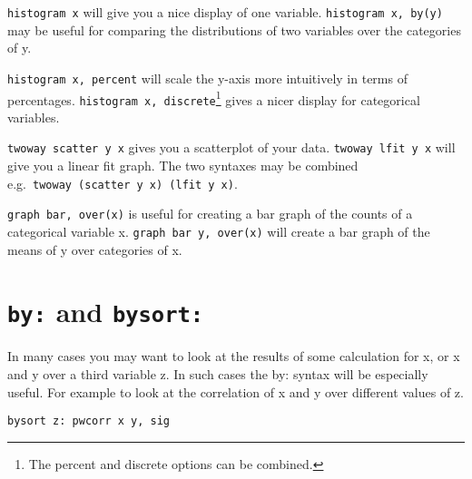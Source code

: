 \documentclass[11pt,nofonts,]{tufte-handout}
\begin{document}
\texttt{histogram\ x} will give you a nice display of one variable.
\texttt{histogram\ x,\ by(y)} may be useful for comparing the
distributions of two variables over the categories of y.

\texttt{histogram\ x,\ percent} will scale the y-axis more intuitively
in terms of percentages. \texttt{histogram\ x,\ discrete}\footnote{The
  percent and discrete options can be combined.} gives a nicer display
for categorical variables.

\texttt{twoway\ scatter\ y\ x} gives you a scatterplot of your data.
\texttt{twoway\ lfit\ y\ x} will give you a linear fit graph. The two
syntaxes may be combined
e.g.~\texttt{twoway\ (scatter\ y\ x)\ (lfit\ y\ x)}.

\texttt{graph\ bar,\ over(x)} is useful for creating a bar graph of the
counts of a categorical variable x. \texttt{graph\ bar\ y,\ over(x)}
will create a bar graph of the means of y over categories of x.

\hypertarget{by-and-bysort}{%
\section{\texorpdfstring{\texttt{by:} and
\texttt{bysort:}}{by: and bysort:}}\label{by-and-bysort}}

In many cases you may want to look at the results of some calculation
for x, or x and y over a third variable z. In such cases the by: syntax
will be especially useful. For example to look at the correlation of x
and y over different values of z.

\texttt{bysort\ z:\ pwcorr\ x\ y,\ sig}
\end{document}
